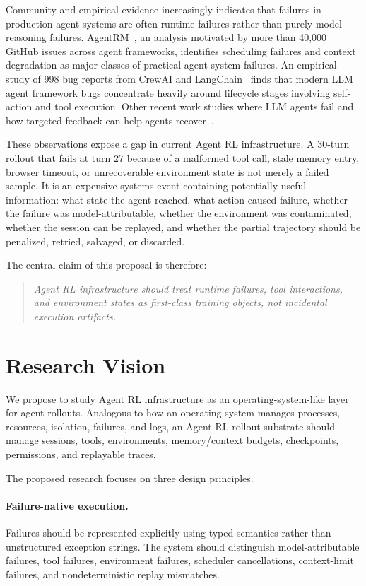 \documentclass[11pt]{article}
\begin{document}
Community and empirical evidence increasingly indicates that failures in production agent systems are often runtime failures rather than purely model reasoning failures.
AgentRM~\cite{agentrm2026}, an analysis motivated by more than 40,000 GitHub issues across agent frameworks, identifies scheduling failures and context degradation as major classes of practical agent-system failures.
An empirical study of 998 bug reports from CrewAI and LangChain~\cite{bugstudy2026} finds that modern LLM agent framework bugs concentrate heavily around lifecycle stages involving self-action and tool execution.
Other recent work studies where LLM agents fail and how targeted feedback can help agents recover~\cite{wherellmagentsfail2025}.

These observations expose a gap in current Agent RL infrastructure.
A 30-turn rollout that fails at turn 27 because of a malformed tool call, stale memory entry, browser timeout, or unrecoverable environment state is not merely a failed sample.
It is an expensive systems event containing potentially useful information:
what state the agent reached, what action caused failure, whether the failure was model-attributable, whether the environment was contaminated, whether the session can be replayed, and whether the partial trajectory should be penalized, retried, salvaged, or discarded.

The central claim of this proposal is therefore:

\begin{quote}
\emph{Agent RL infrastructure should treat runtime failures, tool interactions, and environment states as first-class training objects, not incidental execution artifacts.}
\end{quote}

\section{Research Vision}

We propose to study Agent RL infrastructure as an operating-system-like layer for agent rollouts.
Analogous to how an operating system manages processes, resources, isolation, failures, and logs, an Agent RL rollout substrate should manage sessions, tools, environments, memory/context budgets, checkpoints, permissions, and replayable traces.

The proposed research focuses on three design principles.

\paragraph{Failure-native execution.}
Failures should be represented explicitly using typed semantics rather than unstructured exception strings.
The system should distinguish model-attributable failures, tool failures, environment failures, scheduler cancellations, context-limit failures, and nondeterministic replay mismatches.
\end{document}
